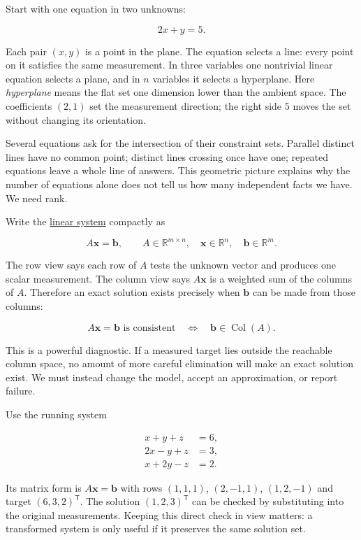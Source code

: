 Start with one equation in two unknowns:

\[
2x+y=5.
\]

Each pair \((x,y)\) is a point in the plane. The equation selects a line: every point on it satisfies the same measurement. In three variables one nontrivial linear equation selects a plane, and in \(n\) variables it selects a hyperplane. Here \emph{hyperplane} means the flat set one dimension lower than the ambient space. The coefficients \((2,1)\) set the measurement direction; the right side \(5\) moves the set without changing its orientation.

Several equations ask for the intersection of their constraint sets. Parallel distinct lines have no common point; distinct lines crossing once have one; repeated equations leave a whole line of answers. This geometric picture explains why the number of equations alone does not tell us how many independent facts we have. We need rank.

Write the \hyperref[01-foundations-i-ch019]{linear system} compactly as

\[
A\mathbf x=\mathbf b,
\qquad A\in\mathbb R^{m\times n},\quad
\mathbf x\in\mathbb R^n,\quad\mathbf b\in\mathbb R^m.
\]

The row view says each row of \(A\) tests the unknown vector and produces one scalar measurement. The column view says \(A\mathbf x\) is a weighted sum of the columns of \(A\). Therefore an exact solution exists precisely when \(\mathbf b\) can be made from those columns:

\[
A\mathbf x=\mathbf b\text{ is consistent}
\quad\Longleftrightarrow\quad
\mathbf b\in\operatorname{Col}(A).
\]

This is a powerful diagnostic. If a measured target lies outside the reachable column space, no amount of more careful elimination will make an exact solution exist. We must instead change the model, accept an approximation, or report failure.

Use the running system

\[
\begin{aligned}
x+y+z&=6,\\
2x-y+z&=3,\\
x+2y-z&=2.
\end{aligned}
\]

Its matrix form is \(A\mathbf x=\mathbf b\) with rows \((1,1,1)\), \((2,-1,1)\), \((1,2,-1)\) and target \((6,3,2)^\mathsf T\). The solution \((1,2,3)^\mathsf T\) can be checked by substituting into the original measurements. Keeping this direct check in view matters: a transformed system is only useful if it preserves the same solution set.

